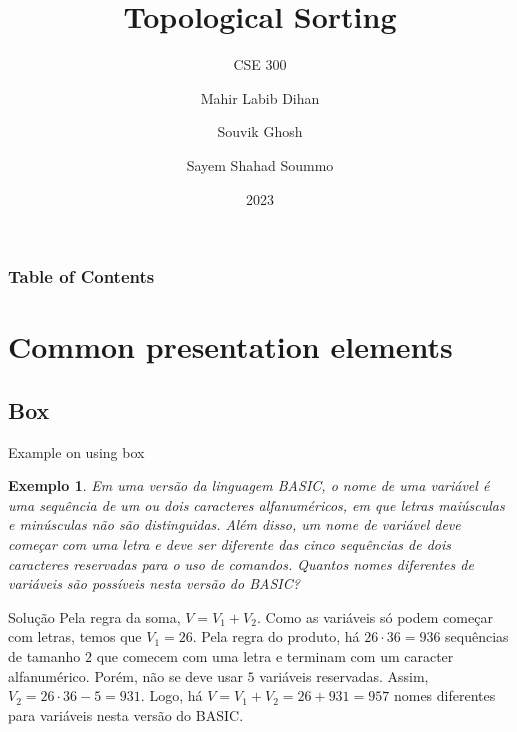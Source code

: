 \documentclass[aspectratio=169,t,xcolor=table]{beamer}
\newtheorem{ex}{Exemplo}
\begin{document}
\title[Inf UFG]{Topological Sorting}
\subtitle{CSE 300}

\author{Mahir Labib Dihan\\ \and Souvik Ghosh\\ \and Sayem Shahad Soummo\\}

\date{2023}
\frame[noframenumbering]{\titlepage}



\begin{frame}
    \frametitle{Table of Contents}
    \tableofcontents
\end{frame}


\section{Common presentation elements}

\subsection{Box}

\begin{frame}{Example on using box}

    \footnotesize
    
    \begin{ex}
        Em uma versão da linguagem BASIC, o nome de uma variável é uma sequência de um ou dois caracteres alfanuméricos, em que letras maiúsculas e minúsculas não são distinguidas. Além disso, um nome de variável deve começar com uma letra e deve ser diferente das cinco sequências de dois caracteres reservadas para o uso de comandos. Quantos nomes diferentes de variáveis são possíveis nesta versão do BASIC?
    \end{ex}
    
    \begin{block}{Solução}
        Pela regra da soma, $V=V_1+V_2$. Como as variáveis só podem começar com letras, temos que $V_1=26$. Pela regra do produto, há $26\cdot 36=936$ sequências de tamanho $2$ que comecem com uma letra e terminam com um caracter alfanumérico. Porém, não se deve usar $5$ variáveis reservadas. Assim, $V_2=26\cdot 36-5=931$. Logo, há $V=V_1+V_2 = 26+931=957$ nomes diferentes para variáveis nesta versão do BASIC.
    \end{block}

\end{frame}
\end{document}
